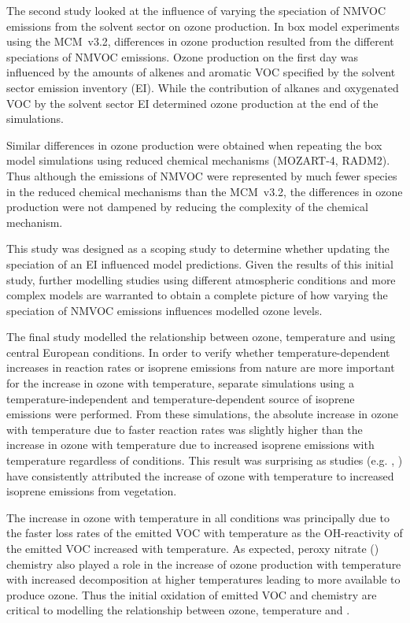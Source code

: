 The second study looked at the influence of varying the speciation of NMVOC emissions from the solvent sector on ozone production.
In box model experiments using the MCM~v3.2, differences in ozone production resulted from the different speciations of NMVOC emissions.
Ozone production on the first day was influenced by the amounts of alkenes and aromatic VOC specified by the solvent sector emission inventory (EI).
While the contribution of alkanes and oxygenated VOC by the solvent sector EI determined ozone production at the end of the simulations.

Similar differences in ozone production were obtained when repeating the box model simulations using reduced chemical mechanisms (MOZART-4, RADM2).
Thus although the emissions of NMVOC were represented by much fewer species in the reduced chemical mechanisms than the MCM~v3.2, the differences in ozone production were not dampened by reducing the complexity of the chemical mechanism.

This study was designed as a scoping study to determine whether updating the speciation of an EI influenced model predictions.
Given the results of this initial study, further modelling studies using different atmospheric conditions and more complex models are warranted to obtain a complete picture of how varying the speciation of NMVOC emissions influences modelled ozone levels.

The final study modelled the relationship between ozone, temperature and  using central European conditions.
In order to verify whether temperature-dependent increases in reaction rates or isoprene emissions from nature are more important for the increase in ozone with temperature, separate simulations using a temperature-independent and temperature-dependent source of isoprene emissions were performed.
From these simulations, the absolute increase in ozone with temperature due to faster reaction rates was slightly higher than the increase in ozone with temperature due to increased isoprene emissions with temperature regardless of  conditions.
This result was surprising as studies (e.g. \citep{Racherla:2008}, \citep{Doherty:2013}) have consistently attributed the increase of ozone with temperature to increased isoprene emissions from vegetation.

The increase in ozone with temperature in all  conditions was principally due to the faster loss rates of the emitted VOC with temperature as the OH-reactivity of the emitted VOC increased with temperature.
As expected, peroxy nitrate () chemistry also played a role in the increase of ozone production with temperature with increased  decomposition at higher temperatures leading to more  available to produce ozone.
Thus the initial oxidation of emitted VOC and  chemistry are critical to modelling the relationship between ozone, temperature and .

